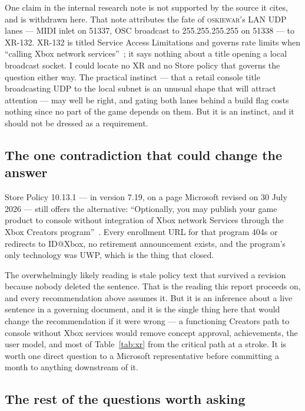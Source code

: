 \documentclass[10pt,letterpaper,twocolumn]{article}
\newcommand{\game}{\textsc{oskiewar}}
\begin{document}
One claim in the internal research note is not supported by the source it cites, and is withdrawn here. That note attributes the fate of \game{}'s LAN UDP lanes --- MIDI inlet on 51337, OSC broadcast to 255.255.255.255 on 51338 --- to XR-132. XR-132 is titled Service Access Limitations and governs rate limits when ``calling Xbox network services''~\cite{msXR}; it says nothing about a title opening a local broadcast socket. I could locate no XR and no Store policy that governs the question either way. The practical instinct --- that a retail console title broadcasting UDP to the local subnet is an unusual shape that will attract attention --- may well be right, and gating both lanes behind a build flag costs nothing since no part of the game depends on them. But it is an instinct, and it should not be dressed as a requirement.

\subsection{The one contradiction that could change the answer}

Store Policy 10.13.1 --- in version 7.19, on a page Microsoft revised on 30 July 2026 --- still offers the alternative: ``Optionally, you may publish your game product to console without integration of Xbox network Services through the Xbox Creators program''~\cite{msStorePolicies}. Every enrollment URL for that program 404s or redirects to ID@Xbox, no retirement announcement exists, and the program's only technology was UWP, which is the thing that closed.

The overwhelmingly likely reading is stale policy text that survived a revision because nobody deleted the sentence. That is the reading this report proceeds on, and every recommendation above assumes it. But it is an inference about a live sentence in a governing document, and it is the single thing here that would change the recommendation if it were wrong --- a functioning Creators path to console without Xbox services would remove concept approval, achievements, the user model, and most of Table~\ref{tab:xr} from the critical path at a stroke. It is worth one direct question to a Microsoft representative before committing a month to anything downstream of it.

\subsection{The rest of the questions worth asking}
\end{document}
